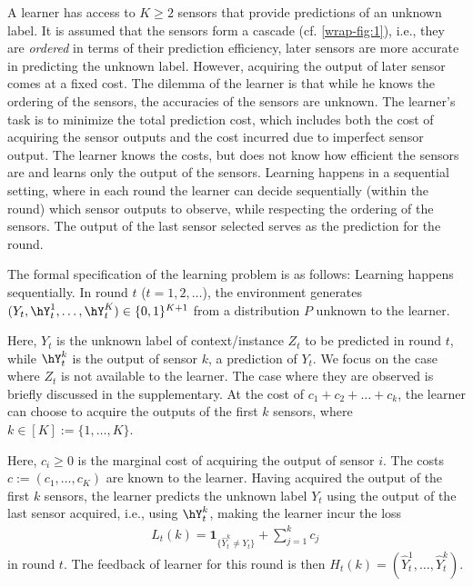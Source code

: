 A learner has access to $K\geq 2$ sensors that provide predictions
of an unknown label. 
 It is assumed that the sensors form a cascade (cf. \cref{wrap-fig:1}),
i.e., they are  \emph{ordered} in terms of their prediction efficiency,
later sensors are more accurate in predicting the unknown label.
However, acquiring the output of later sensor comes at a fixed cost.
The dilemma of the learner is that while he knows the ordering of the sensors,
the accuracies of the sensors are unknown.
The learner's task is to minimize the total prediction cost, which includes
both the cost of acquiring the sensor outputs and the cost incurred due to imperfect
sensor output.
The learner knows the costs, but does not know how efficient the sensors are
and learns only the output of the sensors.
Learning happens in a sequential setting, where in each round the learner can decide
sequentially (within the round) which sensor outputs to observe,
while respecting the ordering of the sensors.
The output of the last sensor selected serves as the prediction for the round.

The formal specification of the learning problem is as follows:
Learning happens sequentially.
In round $t$ ($t=1,2,\dots$), 
the environment generates 
$(Y_t,\hY_t^1,\dots,\hY_t^K)\in \{0,1\}^{K+1}$ from a distribution $P$ unknown to the learner.

Here, $Y_t$ is the unknown label of context/instance $Z_t$ to be predicted in round $t$, while $\hY_t^k$ is the output of sensor
$k$, a prediction of $Y_t$. We focus on the case where $Z_t$ is not available to the learner. The case where they are observed is briefly discussed in the supplementary. 
At the cost of $c_1+ c_2 + \dots + c_k$,
the learner can choose to acquire the outputs of the first $k$ sensors,
where $k\in [K] := \{1,\dots,K\}$. 

Here, $c_i\ge 0$ is the marginal cost of acquiring the output of sensor $i$.
The costs $c := (c_1,\dots,c_K)$ are known to the learner.
Having acquired the output of the first $k$ sensors, the learner predicts the unknown label $Y_t$ using
the output of the last sensor acquired, i.e., using $\hY_t^k$, making the learner incur the loss
\begin{align*}
L_t(k)=\mathbf{1}_{\{\hat{Y}^k_t\neq Y_t\}}+\sum_{j=1}^k c_j\,
\end{align*}
in round $t$.
The feedback of learner for this round is then $H_t(k)=(\hat{Y}^1_t,\ldots,\hat{Y}^k_t)$.




